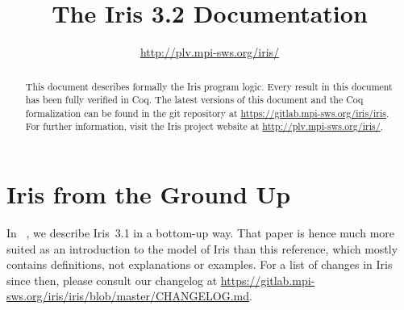 \documentclass[10pt]{article}
\title{\bfseries The Iris 3.2 Documentation}
\author{\url{http://plv.mpi-sws.org/iris/}}
\begin{document}
\maketitle
\thispagestyle{empty}
\vfill
\begin{abstract}
This document describes formally the Iris program logic.
Every result in this document has been fully verified in Coq.
The latest versions of this document and the Coq formalization can be found in the git repository at \url{https://gitlab.mpi-sws.org/iris/iris}.
For further information, visit the Iris project website at \url{http://plv.mpi-sws.org/iris/}.
\end{abstract}

\clearpage\begingroup
\tableofcontents
\endgroup

\clearpage\begingroup
\section{Iris from the Ground Up}
In ~\cite{iris-ground-up}, we describe Iris~3.1 in a bottom-up way.
That paper is hence much more suited as an introduction to the model of Iris than this reference, which mostly contains definitions, not explanations or examples.
For a list of changes in Iris since then, please consult our changelog at \url{https://gitlab.mpi-sws.org/iris/iris/blob/master/CHANGELOG.md}.
\endgroup

\clearpage\begingroup

\endgroup
\clearpage\begingroup

\endgroup
\clearpage\begingroup

\endgroup
\clearpage\begingroup

\endgroup
\clearpage\begingroup

\endgroup
\clearpage\begingroup

\endgroup
\clearpage\begingroup

\endgroup
\clearpage\begingroup

\endgroup
\clearpage\begingroup

\endgroup
\clearpage\begingroup
\printbibliography
\endgroup
\end{document}
